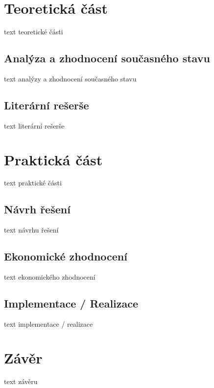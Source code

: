 \documentclass[
BP,bw,print,a4paper,11pt,fonts,numbering,twoside,margins,longappendices,italiccaps
]{./tulpackage/tulthesis}
\begin{document}
\chapter{Teoretická část}
text teoretické části

\section{Analýza a zhodnocení současného stavu}
text analýzy a zhodnocení současného stavu

\section{Literární rešerše}
text literární rešerše

\cleardoublepage%

\chapter{Praktická část}
text praktické části

\section{Návrh řešení}
text návrhu řešení

\section{Ekonomické zhodnocení}
text ekonomického zhodnocení

\section{Implementace / Realizace}
text implementace / realizace

\cleardoublepage%

\chapter*{Závěr}
text závěru

\cleardoublepage%


\printbibliography[heading=bibintoc, title=\TULbibname]
\end{document}
